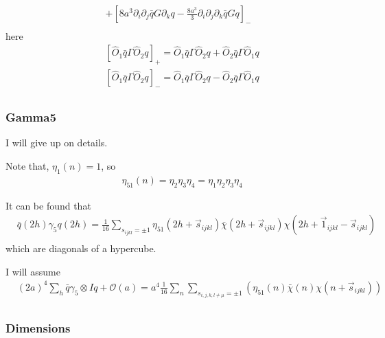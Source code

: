 {\begin{equation}
\begin{split}
+\left[8a^3\partial _i\partial _j \bar{q} G \partial _k q - \frac{8a^3}{3}\partial _i\partial _j\partial _k \bar{q}G q\right]_-\\
\end{split}
\end{equation} 
here
\begin{equation}
\begin{split}
&[\hat{O}_1\bar{q} \Gamma \hat{O}_2q]_+ = \hat{O}_1\bar{q} \Gamma \hat{O}_2q + \hat{O}_2\bar{q} \Gamma \hat{O}_1q\\
&[\hat{O}_1\bar{q} \Gamma \hat{O}_2q]_- = \hat{O}_1\bar{q} \Gamma \hat{O}_2q - \hat{O}_2\bar{q} \Gamma \hat{O}_1q\\
\end{split}
\end{equation} 
}


\subsubsection{\label{sec:gamma5ks}Gamma5}

I will give up on details.

Note that, $\eta _1(n)=1$, so
\begin{equation}
\begin{split}
&\eta_{51}(n)=\eta _2\eta_3\eta_4=\eta _1\eta _2\eta_3\eta_4
\end{split}
\end{equation} 

It can be found that
\begin{equation}
\begin{split}
&\bar{q}(2h)\gamma _5 q (2h)=\frac{1}{16}\sum _{s_{ijkl}=\pm 1}\eta_{51}(2h+\vec{s}_{ijkl})\bar{\chi}(2h+\vec{s}_{ijkl})\chi (2h+\vec{1}_{ijkl}-\vec{s}_{ijkl})\\
\end{split}
\end{equation} 
which are diagonals of a hypercube.

I will assume
\textcolor[rgb]{0,0,1}{
\begin{equation}
\begin{split}
&(2a)^4\sum _h \bar{q}\gamma _5\otimes I q + \mathcal{O}(a) = a^4 \frac{1}{16}\sum _n \sum _{s_{i,j,k,l\neq \mu }=\pm 1}\left(\eta _{51}(n)\bar{\chi}(n)\chi(n+\vec{s}_{ijkl})\right)\\
\end{split}
\end{equation}
}


\subsubsection{\label{sec:gammaksdimension}Dimensions}

